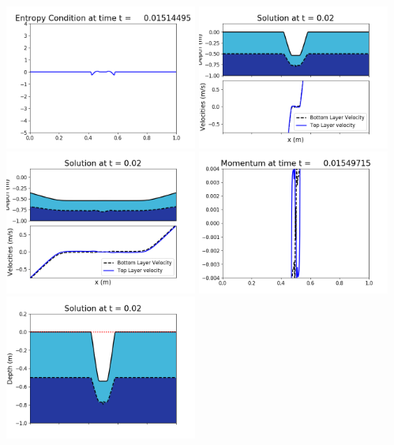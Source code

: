 \documentclass[11pt]{article}
\begin{document}
\vskip 10pt 
\includegraphics[width=0.475\textwidth]{frame0044fig1009.png}
\vskip 10pt 
\includegraphics[width=0.475\textwidth]{frame0045fig1001.png}
\includegraphics[width=0.475\textwidth]{frame0045fig1002.png}
\vskip 10pt 
\includegraphics[width=0.475\textwidth]{frame0045fig1003.png}
\includegraphics[width=0.475\textwidth]{frame0045fig1006.png}
\end{document}
